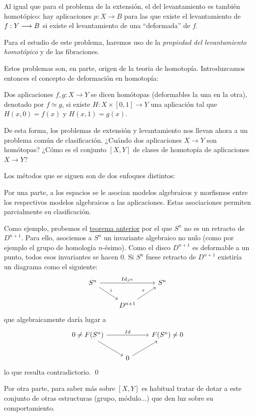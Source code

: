 Al igual que para el problema de la extensión, el del levantamiento es también homotópico: hay aplicaciones $p : X \longrightarrow B$ para las que existe el levantamiento de $f : \nobreak Y \longrightarrow B$ si existe el levantamiento de una ``deformada'' de $f$. \par

Para el estudio de este problema, haremos uso de la \textit{propiedad del levantamiento homotópico} y de las fibraciones. 

%

Estos problemas son, en parte, origen de la teoria de homotopía. Introduzcamos entonces el concepto de deformación en homotopía:
\begin{defin}
Dos aplicaciones $f, g : X \longrightarrow Y$ se dicen homótopas (deformables la una en la otra), denotado por $f \simeq g$, si existe  $H : X \times [0,1] \longrightarrow Y$ una aplicación tal que $H(x ,0) = f(x)$ y $H(x, 1) = g(x)$.
\end{defin}

De esta forma, los problemas de extensión y levantamiento nos llevan ahora a un problema común de clasificación. ¿Cuándo dos aplicaciones $X \longrightarrow Y$ son homótopas? ¿Cómo es el conjunto $[X, Y]$ de clases de homotopía de aplicaciones $X \longrightarrow Y$? \par 
Los métodos que se siguen son de dos enfoques distintos:\par 
Por una parte, a los espacios se le asocian modelos algebraicos y morfismos entre los respectivos modelos algebraicos a las aplicaciones. Estas asociaciones permiten parcialmente su clasificación. \par 
Como ejemplo, probemos el \hyperlink{c1t:retractoh}{teorema anterior} por el que $S^n$ no es un retracto de $D^{n+1}$. Para ello, asociemos a $S^n$ un invariante algebraico no nulo (como por ejemplo el grupo de homología $n$-ésimo). Como el disco $D^{n+1}$ es deformable a un punto, todos esos invariantes se hacen 0. Si $S^n$ fuese retracto de $D^{n+1}$ existiría un diagrama como el siguiente:
$$
\begin{tikzcd}
	S^n \arrow{rr}{Id_{S^n}} \drar{i} & & S^n \\
		&	D^{n+1} \urar{r} & 
\end{tikzcd}
$$
que algebraicamente daría lugar a 
$$
\begin{tikzcd}
	0 \neq F(S^n) \arrow{rr}{Id} \drar & &  F(S^n) \neq 0 \\
		&	0 \urar & 
\end{tikzcd}
$$
lo que resulta contradictorio. \qed \par

Por otra parte, para saber más sobre $[X, Y]$ es habitual tratar de dotar a este conjunto de otras estructuras (grupo, módulo...) que den luz sobre su comportamiento. \par